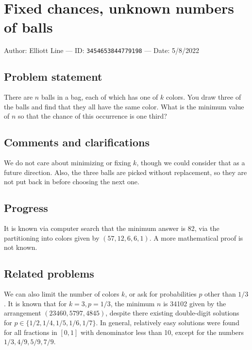
\section{Fixed chances, unknown numbers of balls}

Author: Elliott Line --- ID: \verb`3454653844779198` --- Date: 5/8/2022

\subsection{Problem statement}

There are $n$ balls in a bag, each of which has one of $k$ colors. You draw three of the balls and find that they all have the same color. What is the minimum value of $n$ so that the chance of this occurrence is one third?

\subsection{Comments and clarifications}

We do not care about minimizing or fixing $k$, though we could consider that as a future direction. Also, the three balls are picked without replacement, so they are not put back in before choosing the next one.

\subsection{Progress}

It is known via computer search that the minimum answer is 82, via the partitioning into colors given by $(57,12,6,6,1)$. A more mathematical proof is not known.

\subsection{Related problems}

We can also limit the number of colors $k$, or ask for probabilities $p$ other than $1/3$. It is known that for $k=3,p=1/3$, the minimum $n$ is 34102 given by the arrangement $(23460, 5797, 4845)$, despite there existing double-digit solutions for $p\in\{1/2,1/4,1/5,1/6,1/7\}$. In general, relatively easy solutions were found for all fractions in $[0,1]$ with denominator less than 10, except for the numbers $1/3,4/9,5/9,7/9$.

